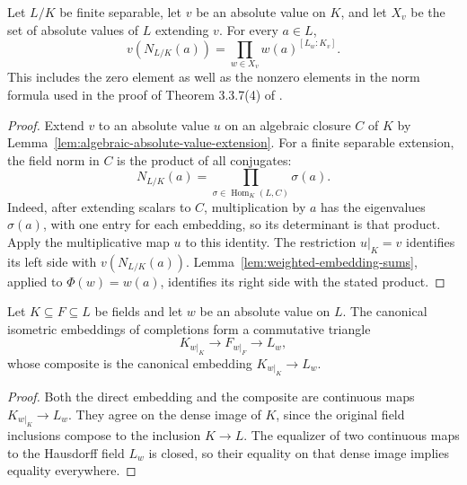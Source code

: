 \begin{proposition}\label{prop:local-norm-product}
\leanok
{}
Let $L/K$ be finite separable, let $v$ be an absolute value on $K$,
and let $X_v$ be the set of absolute values of $L$ extending $v$.
For every $a\in L$,
\[
 v(N_{L/K}(a))=\prod_{w\in X_v}w(a)^{[L_w:K_v]}.
\]
This includes the zero element as well as the nonzero elements in
the norm formula used in the proof of Theorem 3.3.7(4)
of \cite{chen-moriwaki}.
\end{proposition}
\begin{proof}
Extend $v$ to an absolute value $u$ on an algebraic closure $C$ of
$K$ by Lemma~\ref{lem:algebraic-absolute-value-extension}.
For a finite separable extension, the field norm in $C$ is the
product of all conjugates:
\[
 N_{L/K}(a)=\prod_{\sigma\in\operatorname{Hom}_K(L,C)}\sigma(a).
\]
Indeed, after extending scalars to $C$, multiplication by $a$ has
the eigenvalues $\sigma(a)$, with one entry for each embedding, so
its determinant is that product. Apply the multiplicative map $u$
to this identity. The restriction $u|_K=v$ identifies its left side
with $v(N_{L/K}(a))$. Lemma~\ref{lem:weighted-embedding-sums},
applied to $\Phi(w)=w(a)$, identifies its right side with the stated
product.
\end{proof}

\begin{lemma}
\label{lem:completion-tower}
\leanok
{}
Let $K\subseteq F\subseteq L$ be fields and let $w$ be an absolute
value on $L$. The canonical isometric embeddings of completions form
a commutative triangle
\[
 K_{w|_K}\longrightarrow F_{w|_F}\longrightarrow L_w,
\]
whose composite is the canonical embedding $K_{w|_K}\to L_w$.
\end{lemma}
\begin{proof}
Both the direct embedding and the composite are continuous maps
$K_{w|_K}\to L_w$. They agree on the dense image of $K$, since
the original field inclusions compose to the inclusion $K\to L$.
The equalizer of two continuous maps to the Hausdorff field $L_w$
is closed, so their equality on that dense image implies equality
everywhere.
\end{proof}

